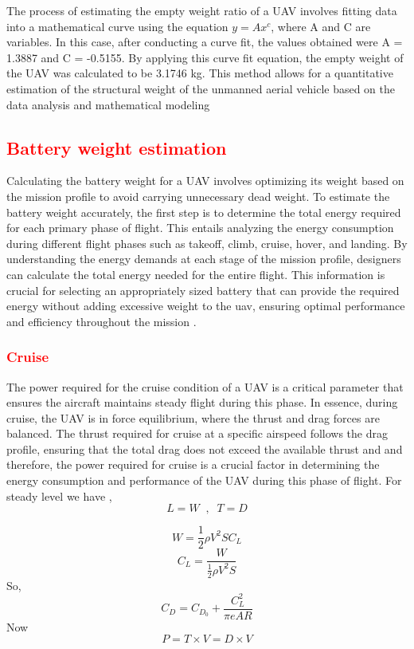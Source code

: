 \documentclass[12 pt]{article}
\begin{document}
The process of estimating the empty weight ratio of a UAV involves fitting data into a mathematical curve using the equation $y = A x^c$, where A and C are variables. In this case, after conducting a curve fit, the values obtained were A = 1.3887 and C = -0.5155. By applying this curve fit equation, the empty weight of the UAV was calculated to be 3.1746 kg. This method allows for a quantitative estimation of the structural weight of the unmanned aerial vehicle based on the data analysis and mathematical modeling

\subsection{\textcolor{red}{Battery weight estimation}}
Calculating the battery weight for a UAV  involves optimizing its weight based on the mission profile to avoid carrying unnecessary dead weight. To estimate the battery weight accurately, the first step is to determine the total energy required for each primary phase of flight. This entails analyzing the energy consumption during different flight phases such as takeoff, climb, cruise, hover, and landing. By understanding the energy demands at each stage of the mission profile, designers can calculate the total energy needed for the entire flight. This information is crucial for selecting an appropriately sized battery that can provide the required energy without adding excessive weight to the uav, ensuring optimal performance and efficiency throughout the mission
.

\subsubsection{\textcolor{red}{Cruise}}
The power required for the cruise condition of a UAV is a critical parameter that ensures the aircraft maintains steady flight during this phase. In essence, during cruise, the UAV is in force equilibrium, where the thrust and drag forces are balanced. The thrust required for cruise at a specific airspeed follows the drag profile, ensuring that the total drag does not exceed the available thrust and and therefore, the power required for cruise is a crucial factor in determining the energy consumption and performance of the UAV during this phase of flight.
For steady level we have ,
$$ L = W \; \; , \; \; T = D$$

$$ W = \frac{1}{2} \rho V^2 S C_L $$
$$ C_L = \frac{W}{\frac{1}{2} \rho V^2 S}$$
So,
$$ C_D = C_{D_0} + \frac{C_L^2}{\pi e AR} $$
Now 
$$ P = T\times V = D\times V $$
\end{document}

